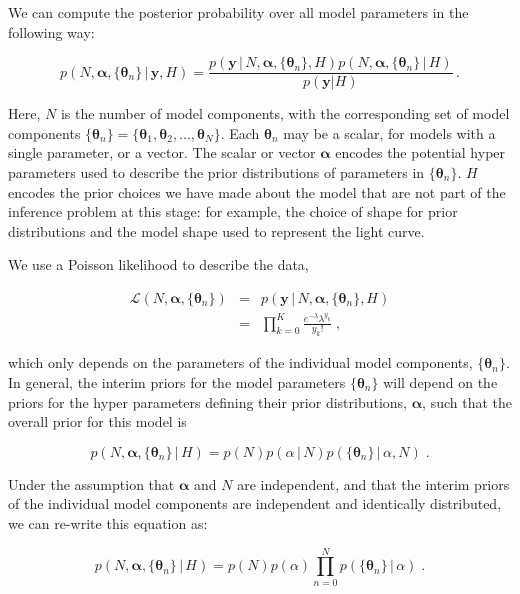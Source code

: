 \documentclass[12pt]{emulateapj}
\newcommand{\given}{\,|\,}
\newcommand{\counts}{y}
\newcommand{\likelihood}{{\mathcal L}}
\begin{document}
We can compute the posterior probability over all model parameters in the following way:

\begin{equation}
p(N, \bm{\alpha},\{\bm{\theta}_n \} \given \bm{\counts}, H) = \frac{p(\bm{\counts} \given N, \bm{\alpha}, \{\bm{\theta}_n \}, H) p(N, \bm{\alpha}, \{\bm{\theta}_n \} \given H)}{p(\bm{\counts} | H)} \, .
\end{equation}

Here, $N$ is the number of model components, with the corresponding set of model components $\{\bm{\theta}_n\} = \{ \bm{\theta}_1, \bm{\theta}_2, ..., \bm{\theta}_N \}$. Each $\bm{\theta}_n$ may be a scalar, for models with a single parameter, or a vector.
The scalar or vector $\bm{\alpha}$ encodes the potential hyper parameters used to describe the prior distributions of parameters in $\{\bm{\theta}_n\}$. $H$ encodes the prior choices we have
made about the model that are not part of the inference problem at this stage: for example, the choice of shape for prior distributions and the model shape used to represent the light curve.

We use a Poisson likelihood to describe the data,

\begin{eqnarray}
\likelihood(N, \bm{\alpha}, \{\bm{\theta}_n \}) & = & p(\bm{\counts} \given N, \bm{\alpha}, \{\bm{\theta}_n \}, H) \\ \nonumber
 &= & \prod\limits_{k=0}^{K}{ \frac{e^{-\lambda} \lambda^{y_k} }{y_k! }} \; ,
\end{eqnarray}

which only depends on the parameters of the individual model components, $\{\bm{\theta}_n\}$. In general, the interim priors for the model 
parameters $\{\bm{\theta}_n\}$ will depend on the priors for the hyper parameters defining their prior distributions, $\bm{\alpha}$, such that the
overall prior for this model is

\begin{equation}
p(N, \bm{\alpha}, \{\bm{\theta}_n \} \given H) = p(N)p(\alpha\given N)p(\{\bm{\theta}_n\}\given \alpha, N) \; .
\end{equation}

Under the assumption that $\bm{\alpha}$ and $N$ are independent, and that the interim priors of the individual model components are
independent and identically distributed, we can re-write this equation as:

\begin{equation}
p(N, \bm{\alpha}, \{\bm{\theta}_n \} \given H) = p(N)p(\alpha) \prod\limits_{n=0}^{N}  p(\{\bm{\theta}_n\}\given \alpha) \; .
\end{equation}
\end{document}
